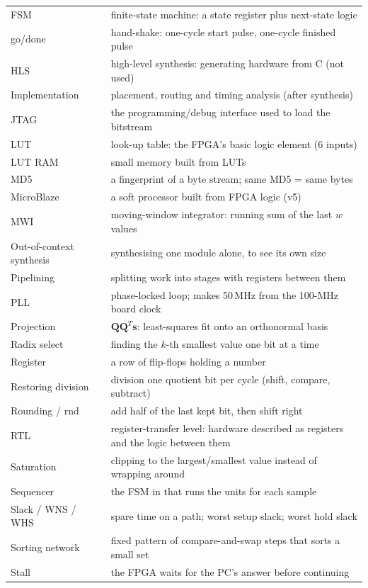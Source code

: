 \documentclass[11pt]{article}
\newcommand{\mods}[1]{\texttt{\detokenize{#1}}}   %
\begin{document}
\begin{longtable}{@{}p{3.6cm}p{11.6cm}@{}}
FSM & finite-state machine: a state register plus next-state logic \\
go/done & hand-shake: one-cycle start pulse, one-cycle finished pulse \\
HLS & high-level synthesis: generating hardware from C (not used) \\
Implementation & placement, routing and timing analysis (after synthesis) \\
JTAG & the programming/debug interface used to load the bitstream \\
LUT & look-up table: the FPGA's basic logic element (6 inputs) \\
LUT RAM & small memory built from LUTs \\
MD5 & a fingerprint of a byte stream; same MD5 = same bytes \\
MicroBlaze & a soft processor built from FPGA logic (v5) \\
MWI & moving-window integrator: running sum of the last $w$ values \\
Out-of-context synthesis & synthesising one module alone, to see its own size \\
Pipelining & splitting work into stages with registers between them \\
PLL & phase-locked loop; makes 50\,MHz from the 100-MHz board clock \\
Projection & $\mathbf{Q}\mathbf{Q}^T\mathbf{s}$: least-squares fit onto an orthonormal basis \\
Radix select & finding the $k$-th smallest value one bit at a time \\
Register & a row of flip-flops holding a number \\
Restoring division & division one quotient bit per cycle (shift, compare, subtract) \\
Rounding / rnd & add half of the last kept bit, then shift right \\
RTL & register-transfer level: hardware described as registers and the logic between them \\
Saturation & clipping to the largest/smallest value instead of wrapping around \\
Sequencer & the FSM in \mods{v6_core} that runs the units for each sample \\
Slack / WNS / WHS & spare time on a path; worst setup slack; worst hold slack \\
Sorting network & fixed pattern of compare-and-swap steps that sorts a small set \\
Stall & the FPGA waits for the PC's answer before continuing \\

\end{longtable}
\end{document}
